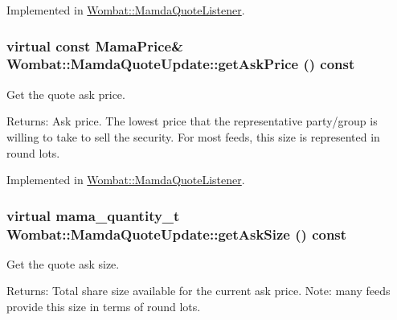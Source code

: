 Implemented in \hyperlink{classWombat_1_1MamdaQuoteListener_0256d6b1b2181919a00cf6d6e903b014}{Wombat::Mamda\-Quote\-Listener}.\hypertarget{classWombat_1_1MamdaQuoteUpdate_a56ea32dd2f84c636685ffd31137501b}{
\subsubsection[getAskPrice]{\setlength{\rightskip}{0pt plus 5cm}virtual const Mama\-Price\& Wombat::Mamda\-Quote\-Update::get\-Ask\-Price () const}}
\label{classWombat_1_1MamdaQuoteUpdate_a56ea32dd2f84c636685ffd31137501b}


Get the quote ask price. 

\begin{Desc}
\item[Returns:]Ask price. The lowest price that the representative party/group is willing to take to sell the security. For most feeds, this size is represented in round lots. \end{Desc}


Implemented in \hyperlink{classWombat_1_1MamdaQuoteListener_b4c49376d3d07db48065adc6d74da196}{Wombat::Mamda\-Quote\-Listener}.\hypertarget{classWombat_1_1MamdaQuoteUpdate_4040feb7d514c900fa4a941607a11c0a}{
\subsubsection[getAskSize]{\setlength{\rightskip}{0pt plus 5cm}virtual mama\_\-quantity\_\-t Wombat::Mamda\-Quote\-Update::get\-Ask\-Size () const}}
\label{classWombat_1_1MamdaQuoteUpdate_4040feb7d514c900fa4a941607a11c0a}


Get the quote ask size. 

\begin{Desc}
\item[Returns:]Total share size available for the current ask price. Note: many feeds provide this size in terms of round lots. \end{Desc}


